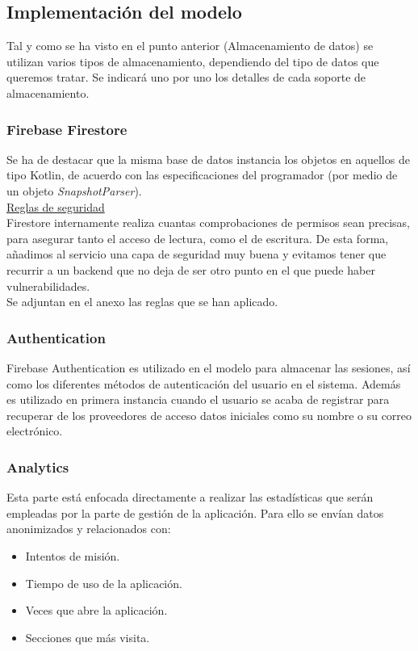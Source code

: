 \documentclass[twoside]{report}
\begin{document}
\subsection{Implementación del modelo}

Tal y como se ha visto en el punto anterior (Almacenamiento de datos) se utilizan varios tipos de almacenamiento, dependiendo del tipo de datos que queremos tratar. Se indicará uno por uno los detalles de cada soporte de almacenamiento.

\subsubsection{Firebase Firestore}

Se ha de destacar que la misma base de datos instancia los objetos en aquellos de tipo Kotlin, de acuerdo con las especificaciones del programador (por medio de un objeto \textit{SnapshotParser}).\\

\underline{Reglas de seguridad}\\

Firestore internamente realiza cuantas comprobaciones de permisos sean precisas, para asegurar tanto el acceso de lectura, como el de escritura. De esta forma, añadimos al servicio una capa de seguridad muy buena y evitamos tener que recurrir a un backend que no deja de ser otro punto en el que puede haber vulnerabilidades.\\

Se adjuntan en el anexo las reglas que se han aplicado.\\

\subsubsection{Authentication}

Firebase Authentication es utilizado en el modelo para almacenar las sesiones, así como los diferentes métodos de autenticación del usuario en el sistema. Además es utilizado en primera instancia cuando el usuario se acaba de registrar para recuperar de los proveedores de acceso datos iniciales como su nombre o su correo electrónico.

\subsubsection{Analytics}

Esta parte está enfocada directamente a realizar las estadísticas que serán empleadas por la parte de gestión de la aplicación. Para ello se envían datos anonimizados y relacionados con:
\begin{itemize}
\item Intentos de misión.
\item Tiempo de uso de la aplicación.
\item Veces que abre la aplicación.
\item Secciones que más visita.
\end{itemize}
\end{document}

